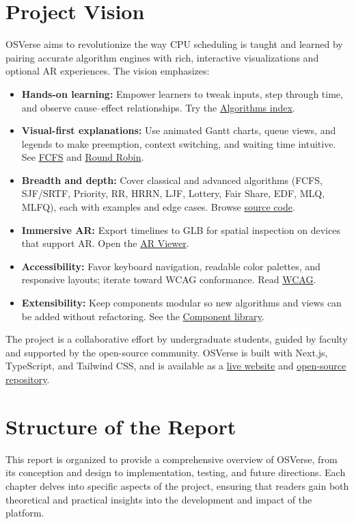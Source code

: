 \documentclass[12pt,a4paper,oneside]{report}
\newcommand{\githubURL}{https://github.com/shreyjain14/osverse-final}
\newcommand{\projectURL}{https://osverse-two.vercel.app}
\begin{document}
\section*{Project Vision}
OSVerse aims to revolutionize the way CPU scheduling is taught and learned by pairing accurate algorithm engines with rich, interactive visualizations and optional AR experiences. The vision emphasizes:
\begin{itemize}
  \item \textbf{Hands-on learning:} Empower learners to tweak inputs, step through time, and observe cause–effect relationships. Try the \href{https://osverse.shreyjain.me/algorithms}{Algorithms index}.
  \item \textbf{Visual-first explanations:} Use animated Gantt charts, queue views, and legends to make preemption, context switching, and waiting time intuitive. See \href{https://osverse.shreyjain.me/fcfs}{FCFS} and \href{https://osverse.shreyjain.me/round-robin}{Round Robin}.
  \item \textbf{Breadth and depth:} Cover classical and advanced algorithms (FCFS, SJF/SRTF, Priority, RR, HRRN, LJF, Lottery, Fair Share, EDF, MLQ, MLFQ), each with examples and edge cases. Browse \href{\githubURL}{source code}.
  \item \textbf{Immersive AR:} Export timelines to GLB for spatial inspection on devices that support AR. Open the \href{https://osverse.shreyjain.me/ar-viewer}{AR Viewer}.
  \item \textbf{Accessibility:} Favor keyboard navigation, readable color palettes, and responsive layouts; iterate toward WCAG conformance. Read \href{https://www.w3.org/WAI/standards-guidelines/wcag/}{WCAG}.
  \item \textbf{Extensibility:} Keep components modular so new algorithms and views can be added without refactoring. See the \href{https://github.com/shreyjain14/osverse-final/tree/master/src/components}{Component library}.
\end{itemize}

The project is a collaborative effort by undergraduate students, guided by faculty and supported by the open-source community. OSVerse is built with Next.js, TypeScript, and Tailwind CSS, and is available as a \href{\projectURL}{live website} and \href{\githubURL}{open-source repository}.

\section*{Structure of the Report}
This report is organized to provide a comprehensive overview of OSVerse, from its conception and design to implementation, testing, and future directions. Each chapter delves into specific aspects of the project, ensuring that readers gain both theoretical and practical insights into the development and impact of the platform.
\end{document}
